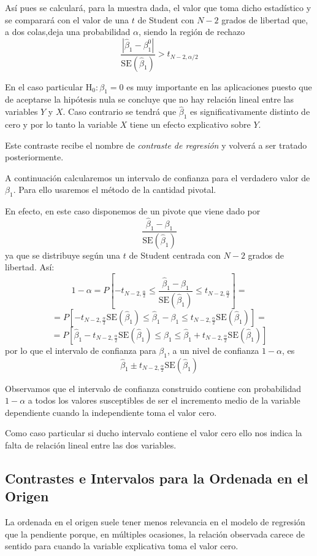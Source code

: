 \documentclass[10pt,a4paper]{book}
\begin{document}
Así pues se calculará, para la muestra dada, el valor que toma dicho estadístico y se comparará con el valor de una $t$ de Student con $N-2$ grados de libertad que, a dos colas,deja una probabilidad $\alpha$, siendo la región de rechazo
$$\dfrac{|\widehat{\beta}_1-\beta^0_1|}{\mathrm{SE}(\widehat{\beta}_1)}>t_{N-2,\alpha/2}$$

En el caso particular $\mathrm{H}_0:\beta_1=0$ es muy importante en las aplicaciones puesto que de aceptarse la hipótesis nula se concluye que no hay relación lineal entre las variables $Y$ y $X$. Caso contrario se tendrá que $\widehat{\beta}_1$ es significativamente distinto de cero y por lo tanto la variable $X$ tiene un efecto explicativo sobre $Y$.

Este contraste recibe el nombre de \textit{contraste de regresión} y volverá a ser tratado posteriormente.

A continuación calcularemos un intervalo de confianza para el verdadero valor de $\beta_1$. Para ello usaremos el método de la cantidad pivotal.

En efecto, en este caso disponemos de un pivote que viene dado por $$\dfrac{\widehat{\beta}_1-\beta_1}{\mathrm{SE}(\widehat{\beta}_1)}$$ ya que se distribuye según una $t$ de Student centrada con $N-2$ grados de libertad. Así:
$$1-\alpha=P\left[-t_{N-2,\frac{\alpha}{2}}\leq\dfrac{\widehat{\beta}_1-\beta_1}{\mathrm{SE}(\widehat{\beta}_1)}\leq t_{N-2,\frac{\alpha}{2}}\right]=$$
$$=P\left[-t_{N-2,\frac{\alpha}{2}}\mathrm{SE}(\widehat{\beta}_1)\leq\widehat{\beta}_1-\beta_1\leq t_{N-2,\frac{\alpha}{2}}\mathrm{SE}(\widehat{\beta}_1)\right]=$$
$$=P\left[\widehat{\beta}_1-t_{N-2,\frac{\alpha}{2}}\mathrm{SE}(\widehat{\beta}_1)\leq\beta_1\leq \widehat{\beta}_1+t_{N-2,\frac{\alpha}{2}}\mathrm{SE}(\widehat{\beta}_1)\right]$$
por lo que el intervalo de confianza para $\beta_1$, a un nivel de confianza $1-\alpha$, es $$\widehat{\beta}_1\pm t_{N-2,\frac{\alpha}{2}}\mathrm{SE}(\widehat{\beta}_1)$$

Observamos que el intervalo de confianza construido contiene con probabilidad $1-\alpha$ a todos los valores susceptibles de ser el incremento medio de la variable dependiente cuando la independiente toma el valor cero.

Como caso particular si ducho intervalo contiene el valor cero ello nos indica la falta de relación lineal entre las dos variables.
		\subsection{Contrastes e Intervalos para la Ordenada en el Origen}
La ordenada en el origen suele tener menos relevancia en el modelo de regresión que la pendiente porque, en múltiples ocasiones, la relación observada carece de sentido para cuando la variable explicativa toma el valor cero.
\end{document}
